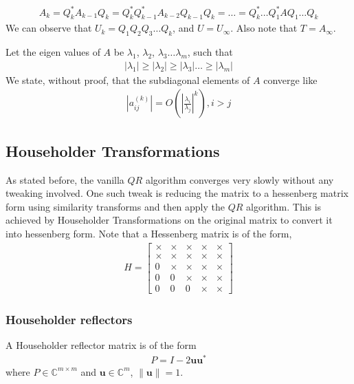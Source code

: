 \documentclass[12pt]{article}
\newcommand{\vecb}[1]{\mathbf{#1}}
\newcommand{\brak}[1]{\ensuremath{\left(#1\right)}}
\newcommand{\defmat}[2]{#1\in\mathbb{C}^{#2\times#2}}
\newcommand{\defvec}[2]{\vecb{#1}\in\mathbb{C}^{#2}}
\newcommand{\abs}[1]{\left\vert#1\right\vert}
\newcommand{\norm}[1]{\left\lVert#1\right\rVert}
\begin{document}
\begin{align}
    A_k = Q_k^{\ast} A_{k - 1} Q_k = Q_k^{\ast} Q_{k - 1}^{\ast} A_{k - 2} Q_{k - 1} Q_k = \dots = Q_k^{\ast}\dots Q_1^{\ast} A Q_1 \dots Q_k
\end{align}
We can observe that $U_k = Q_1 Q_2 Q_3 \dots Q_k$, and $U = U_{\infty}$.
Also note that $T = A_{\infty}$.

Let the eigen values of $A$ be $\lambda_1$, $\lambda_2$, $\lambda_3 \dots \lambda_m$, such that
\begin{align}
    \abs{\lambda_1} \geq \abs{\lambda_2} \geq \abs{\lambda_3} \dots \geq \abs{\lambda_m}
\end{align}
We state, without proof, that the subdiagonal elements of $A$ converge like
\begin{align}
    \abs{a_{ij}^{\brak{k}}} = O\brak{\abs{\frac{\lambda_i}{\lambda_j}}^k}, i > j
\end{align}

\subsection{Householder Transformations}
As stated before, the vanilla $QR$ algorithm converges very slowly without any tweaking involved.
One such tweak is reducing the matrix to a hessenberg matrix form using similarity transforms and then apply the $QR$ algorithm. 
This is achieved by Householder Transformations on the original matrix to convert it into hessenberg form.
\newline
Note that a Hessenberg matrix is of the form,
\begin{align}
H = \begin{bmatrix}
\times & \times & \times & \times & \times\\
\times & \times & \times & \times & \times\\
0 & \times & \times & \times & \times\\
0 & 0 & \times & \times & \times\\
0 & 0 & 0 & \times & \times
\end{bmatrix}   
\end{align}
\subsubsection{Householder reflectors}
A Householder reflector matrix is of the form
\begin{align}
    P = I - 2\vecb{u}\vecb{u}^{\ast}
\end{align}
where $\defmat{P}{m}$ and $\defvec{u}{m}$, $\norm{\vecb{u}} = 1$.
\end{document}
